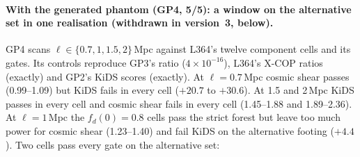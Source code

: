 \documentclass[10pt]{article}
\begin{document}
\paragraph{With the generated phantom (GP4, 5/5): a window on the alternative set in one realisation (withdrawn in version~3, below).} GP4 scans $\ell\in\{0.7,1,1.5,2\}$\,Mpc against L364's twelve component cells and its gates. Its controls reproduce GP3's ratio ($4\times10^{-16}$), L364's X-COP ratios (exactly) and GP2's KiDS scores (exactly).
At $\ell=0.7$\,Mpc cosmic shear passes (0.99--1.09) but KiDS fails in every cell ($+20.7$ to $+30.6$). At 1.5 and 2\,Mpc KiDS passes in every cell and cosmic shear fails in every cell (1.45--1.88 and 1.89--2.36). At $\ell=1$\,Mpc the $f_d(0)=0.8$ cells pass the strict forest but leave too much power for cosmic shear (1.23--1.40) and fail KiDS on the alternative footing ($+4.4$). Two cells pass every gate on the alternative set:
\smallskip
\end{document}
